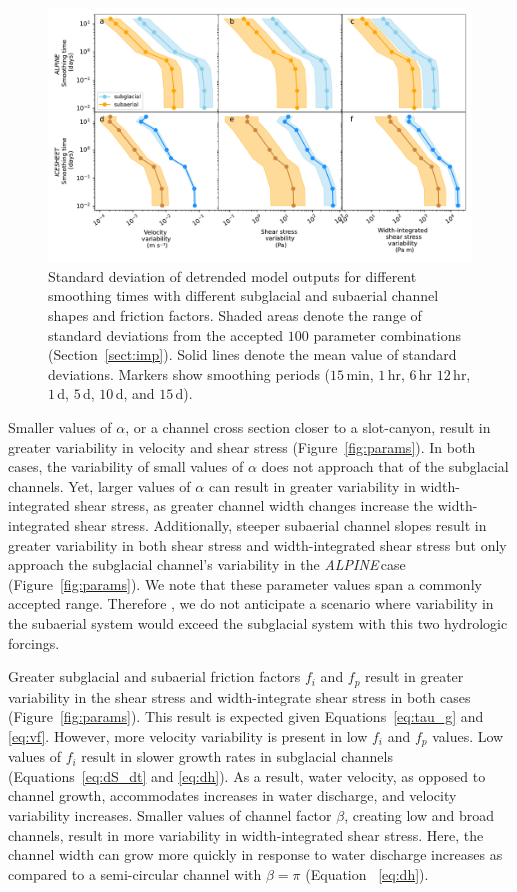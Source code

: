 \documentclass[esurf, manuscript]{copernicus}
\newcommand{\alpine}{\textit{ALPINE}\,}
\begin{document}
\begin{figure}[hbt!]
  \centering
  \includegraphics[width=0.9\linewidth]{Fig3.pdf}
  \caption{Standard deviation of detrended model outputs for different smoothing times with different subglacial and subaerial channel shapes and friction factors.
    Shaded areas denote the range of standard deviations from the accepted $100$ parameter combinations (Section~\ref{sect:imp}).
    Solid lines denote the mean value of standard deviations.
    Markers show smoothing periods ($15$\,\unit{min}, $1$\,\unit{hr}, $6$\,\unit{hr} $12$\,\unit{hr}, $1$\,\unit{d}, $5$\,\unit{d}, $10$\,\unit{d}, and $15$\,\unit{d}).
  }
  \label{fig:multi_run}
\end{figure}

Smaller values of $\alpha$, or a channel cross section closer to a slot-canyon, result in greater variability in velocity and shear stress (Figure~\ref{fig:params}).
In both cases, the variability of small values of $\alpha$ does not approach that of the subglacial channels.
Yet, larger values of $\alpha$ can result in greater variability in width-integrated shear stress, as greater channel width changes increase the width-integrated shear stress.
Additionally, steeper subaerial channel slopes result in greater variability in both shear stress and width-integrated shear stress but only approach the  subglacial channel's variability in the \alpine case (Figure~\ref{fig:params}). 
We note that these parameter values span a commonly accepted range.
Therefore , we do not anticipate a scenario where variability in the subaerial system would exceed the subglacial system with this two hydrologic forcings.

Greater  subglacial and subaerial friction factors $f_i$ and $f_p$ result in greater variability in the shear stress and width-integrate shear stress in both cases (Figure~\ref{fig:params}).
This result is expected given Equations~\ref{eq:tau_g} and \ref{eq:vf}.
However, more velocity variability is present in low  $f_i$ and $f_p$ values. 
Low values of $f_i$ result in slower growth rates in subglacial channels (Equations~\ref{eq:dS_dt} and \ref{eq:dh}).
As a result, water velocity, as opposed to channel growth, accommodates increases in water discharge, and velocity variability increases.
Smaller values of channel factor $\beta$, creating low and broad channels, result in more variability in width-integrated shear stress.
Here, the channel width can grow more quickly in response to water discharge increases as compared to a semi-circular channel with $\beta = \pi$ (Equation~ \ref{eq:dh}).
\end{document}
